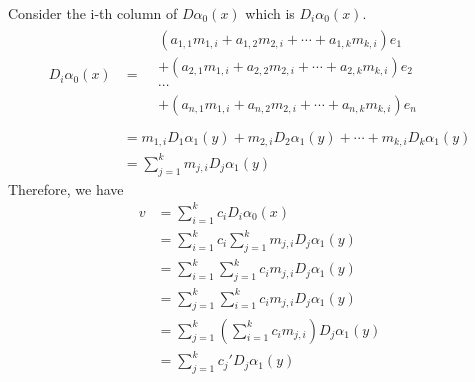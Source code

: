 \begin{itemize}
    Consider the i-th column of $D\alpha_0(x)$ which is $D_i\alpha_0(x)$.
    \begin{equation*}
        \begin{split}
            D_i\alpha_0(x) &= \begin{split}
                &(a_{1,1}m_{1,i} + a_{1,2}m_{2,i}+ \cdots + a_{1,k}m_{k,i})e_1\\
                &+(a_{2,1}m_{1,i} + a_{2,2}m_{2,i}+ \cdots + a_{2,k}m_{k,i})e_2\\
                &\cdots \\
                &+(a_{n,1}m_{1,i} + a_{n,2}m_{2,i}+ \cdots + a_{n,k}m_{k,i})e_n\\
            \end{split}\\
            &= m_{1,i}D_1\alpha_1(y)+ m_{2,i}D_2\alpha_1(y)+\cdots + m_{k,i}D_k\alpha_1(y)\\
            &= \sum_{j=1}^km_{j,i}D_j\alpha_1(y)
        \end{split}
    \end{equation*}
    Therefore, we have 
    \begin{equation*}
        \begin{split}
            v &= \sum_{i=1}^kc_iD_i\alpha_0(x)\\
            &= \sum_{i=1}^kc_i\sum_{j=1}^km_{j,i}D_j\alpha_1(y)\\
            &= \sum_{i=1}^k\sum_{j=1}^kc_im_{j,i}D_j\alpha_1(y)\\
            &= \sum_{j=1}^k\sum_{i=1}^kc_im_{j,i}D_j\alpha_1(y)\\
            &=  \sum_{j=1}^k(\sum_{i=1}^kc_im_{j,i})D_j\alpha_1(y)\\
            &= \sum_{j=1}^kc_j'D_j\alpha_1(y)
        \end{split}
    \end{equation*}
\end{itemize}

